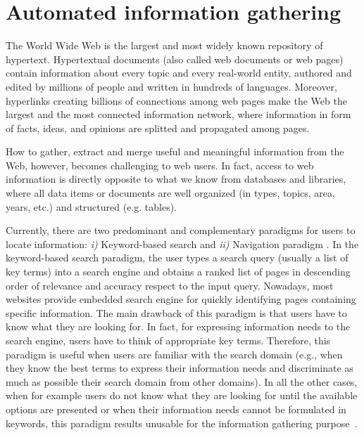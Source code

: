 



\section{Automated information gathering} 
\color{red}    
The World Wide Web is the largest and most widely known repository of hypertext. Hypertextual documents (also called web documents or web pages) contain information about every topic and every real-world entity, authored and edited by millions of people and written in hundreds of languages. Moreover, hyperlinks creating billions of connections among web pages make the Web the largest and the most connected information network, where information in form of facts, ideas, and opinions are splitted and propagated among pages.  

How to gather, extract and merge useful
and meaningful information from the Web, however, becomes challenging to web
users. 
 In fact, access to web information is directly opposite to what we know from databases and libraries, where all data items or documents are well organized (in types, topics, area, years, etc.) and structured (e.g. tables). 
 
Currently, there
are two predominant and complementary paradigms for users to locate information: \emph{i)} Keyword-based search and \emph{ii)} Navigation paradigm \cite{Olston:2003, Fang:2007, Kalbach:2007, Levene:2010}. In the keyword-based search paradigm, the user types a search query (usually a list of key terms) into a search engine and obtains a ranked list of pages in descending order of relevance and accuracy respect to the input query.  
Nowadays, most websites provide embedded search engine for quickly identifying pages containing specific information.
The main drawback of this paradigm is that users have to know what they are looking for. In fact, for expressing information needs to the search engine, users have to think of appropriate key terms. Therefore, this paradigm is useful when users are familiar with the search domain (e.g., when they know the best terms to express their information needs and discriminate as much as possible their search domain from other domains). In all the other cases, when for example users do not know what they are looking for until the available options are presented or when their information needs cannot be formulated in keywords, this paradigm results unusable for the information gathering purpose~\cite{Lee:2005, Olston:2003}.

